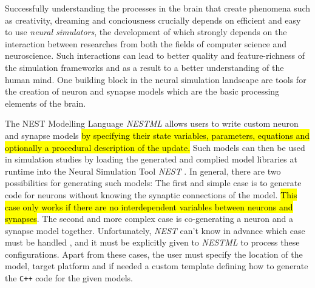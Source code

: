 Successfully understanding the processes in the brain that create phenomena such as creativity, dreaming and conciousness crucially depends on efficient and easy to use \emph{neural simulators}, the development of which strongly depends on the interaction between researches from both the fields of computer science and neuroscience. Such interactions can lead to better quality and feature-richness of the simulation frameworks and as a result to a better understanding of the human mind. One building block in the neural simulation landscape are tools for the creation of neuron and synapse models which are the basic processing elements of the brain. 


The NEST Modelling Language \emph{NESTML}  allows users to write custom neuron and synapse models \hl{by specifying their state variables, parameters, equations and optionally a procedural description of the update.} Such models can then be used in simulation studies by loading the generated and complied model libraries at runtime into the Neural Simulation Tool \emph{NEST} . In general, there are two possibilities for generating such models: The first and simple case is to generate code for neurons without knowing the synaptic connections of the model. \hl{This case only works if there are no interdependent variables between neurons and synapses}. The second and more complex case is co-generating a neuron and a synapse model together. Unfortunately, \emph{NEST} can't  know in advance which case must be handled , and it must be explicitly given to \emph{NESTML} to process these configurations. Apart from these cases, the user must specify the location of the model, target platform and if needed a custom template defining how to generate the \texttt{C++} code for the given models.

